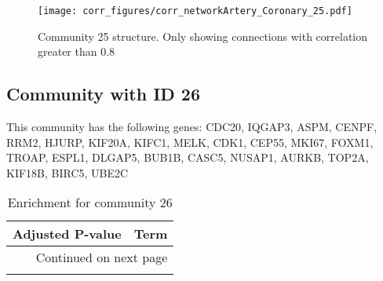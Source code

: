 \begin{figure}[h!]
\centering
\texttt{[image: corr\_figures/corr\_networkArtery\_Coronary\_25.pdf]}
\caption{Community 25 structure. Only showing connections with correlation greater than 0.8}
\end{figure}




\subsection*{Community with ID 26}
This community has the following genes: CDC20, IQGAP3, ASPM, CENPF, RRM2, HJURP, KIF20A, KIFC1, MELK, CDK1, CEP55, MKI67, FOXM1, TROAP, ESPL1, DLGAP5, BUB1B, CASC5, NUSAP1, AURKB, TOP2A, KIF18B, BIRC5, UBE2C
\\
\begin{longtable}{p{2.4cm}p{14.5cm}}
\caption{Enrichment for community 26}\\
\toprule
Adjusted \newline P-value &                                                                                                                                                   Term \\
\midrule
\endhead
\midrule
\multicolumn{2}{r}{{Continued on next page}} \\
\midrule
\endfoot


\end{longtable}
